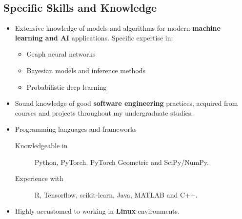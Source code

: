 \documentclass[12pt]{article}
\newcommand{\cvheading}[1]{\subsection*{#1}}
\begin{document}
\cvheading{Specific Skills and Knowledge}
\begin{itemize}
    \item Extensive knowledge of models and algorithms for modern \textbf{machine learning and AI} applications. Specific expertise in:
    \begin{itemize}
        \item Graph neural networks
        \item Bayesian models and inference methods
        \item Probabilistic deep learning
    \end{itemize}

\item Sound knowledge of good \textbf{software engineering} practices, acquired from courses and projects throughout my undergraduate studies.

    \item Programming languages and frameworks
    \begin{description}
        \item [Knowledgeable in] Python, PyTorch, PyTorch Geometric and SciPy/NumPy.
        \item [Experience with] R, Tensorflow, scikit-learn, Java, MATLAB and C++.
    \end{description}

\item Highly accustomed to working in \textbf{Linux} environments.
\end{itemize}
\end{document}
